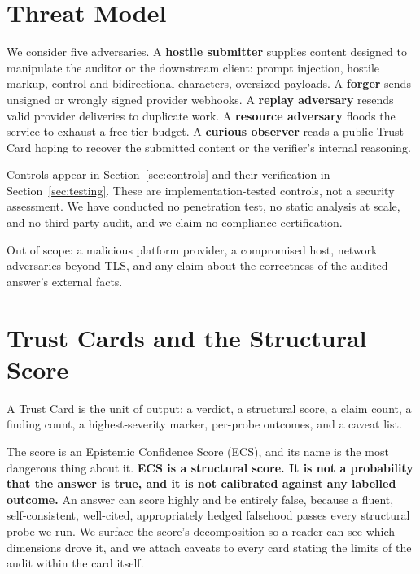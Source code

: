\section{Threat Model}

We consider five adversaries. A \textbf{hostile submitter} supplies content designed to
manipulate the auditor or the downstream client: prompt injection, hostile markup,
control and bidirectional characters, oversized payloads. A \textbf{forger} sends
unsigned or wrongly signed provider webhooks. A \textbf{replay adversary} resends valid
provider deliveries to duplicate work. A \textbf{resource adversary} floods the service to
exhaust a free-tier budget. A \textbf{curious observer} reads a public Trust Card hoping
to recover the submitted content or the verifier's internal reasoning.

Controls appear in Section~\ref{sec:controls} and their verification in
Section~\ref{sec:testing}. These are implementation-tested controls, not a security
assessment. We have conducted no penetration test, no static analysis at scale, and no
third-party audit, and we claim no compliance certification.

Out of scope: a malicious platform provider, a compromised host, network adversaries
beyond TLS, and any claim about the correctness of the audited answer's external facts.

\section{Trust Cards and the Structural Score}

A Trust Card is the unit of output: a verdict, a structural score, a claim count, a
finding count, a highest-severity marker, per-probe outcomes, and a caveat list.

The score is an Epistemic Confidence Score (ECS), and its name is the most dangerous
thing about it. \textbf{ECS is a structural score. It is not a probability that the answer
is true, and it is not calibrated against any labelled outcome.} An answer can score
highly and be entirely false, because a fluent, self-consistent, well-cited,
appropriately hedged falsehood passes every structural probe we run. We surface the
score's decomposition so a reader can see which dimensions drove it, and we attach
caveats to every card stating the limits of the audit within the card itself.

